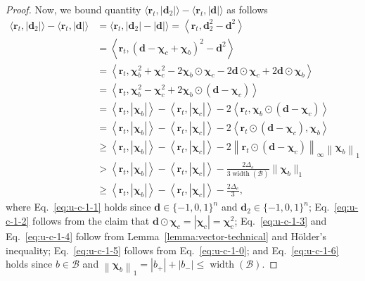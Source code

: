 \documentclass{article}
\newcommand{\B}{\mathcal B}
\DeclareMathOperator{\rank}{width}
\newcommand{\nor}[1]{\left\|#1\right\|}
\renewcommand{\vec}[1]{\boldsymbol{#1}}
\begin{document}
\begin{spacing}{1.1}
\begin{proof}
Now, we bound  quantity $\langle \vec r_t, |\vec d_2| \rangle - \langle \vec r_t, |\vec d| \rangle$ as follows
\begin{align}
\langle \vec r_t, |\vec d_2| \rangle - \langle \vec r_t, |\vec d| \rangle &=
\langle \vec r_t, |\vec d_2|-|\vec d| \rangle = \left\langle \vec r_t, \vec d_2^2- \vec d^2 \right\rangle
\label{eq:u-c-1-1} \\
&= \left\langle \vec r_t, (\vec d-\vec \chi_c+\vec \chi_b)^2- \vec d^2 \right\rangle 
\nonumber \\
&= \left\langle \vec r_t, \vec \chi_b^2+\vec \chi_c^2-2\vec \chi_b\odot \vec \chi_c -
						  2\vec d \odot \vec \chi_c + 2\vec d\odot\vec \chi_b \right\rangle
\nonumber \\
&= \left\langle \vec r_t, \vec \chi_b^2 - \vec \chi_c^2+2\vec \chi_b\odot (\vec d-\vec \chi_c)\right\rangle
\label{eq:u-c-1-2}\\
&= \left\langle \vec r_t, |\vec\chi_b| \right\rangle
  -\left\langle \vec r_t, |\vec\chi_c| \right\rangle
  -2\left\langle \vec r_t, \vec \chi_b\odot (\vec d-\vec \chi_c) \right\rangle
  \nonumber \\
&= \left\langle \vec r_t, |\vec\chi_b| \right\rangle
  -\left\langle \vec r_t, |\vec\chi_c| \right\rangle
  -2\left\langle \vec r_t \odot (\vec d-\vec \chi_c), \vec \chi_b \right\rangle
  \label{eq:u-c-1-3}\\  
& \ge \left\langle \vec r_t, |\vec\chi_b| \right\rangle
  -\left\langle \vec r_t, |\vec\chi_c| \right\rangle
  -2\left\|\vec r_t \odot (\vec d-\vec \chi_c)\right\|_\infty \left\| \vec \chi_b\right\|_1
  \label{eq:u-c-1-4} \\
& > \left\langle \vec r_t, |\vec\chi_b| \right\rangle
  -\left\langle \vec r_t, |\vec\chi_c| \right\rangle
  -\frac{2\Delta_e}{3\rank(\B)} \|\vec\chi_b\|_1 
  \label{eq:u-c-1-5}\\
& \ge \left\langle \vec r_t, |\vec\chi_b| \right\rangle
  -\left\langle \vec r_t, |\vec\chi_c| \right\rangle
  -\frac{2\Delta_e}{3}
  \label{eq:u-c-1-6},
\end{align}
where Eq.~\eqref{eq:u-c-1-1} holds since $\vec d\in \{-1,0,1\}^n$ and $\vec d_2\in \{-1,0,1\}^n$;
Eq.~\eqref{eq:u-c-1-2} follows from the claim that $\vec d \odot \vec \chi_c = |\vec \chi_c|=\vec\chi_c^2$;
Eq.~\eqref{eq:u-c-1-3} and Eq.~\eqref{eq:u-c-1-4} follow from Lemma~\ref{lemma:vector-technical} and H\"older's inequality;
Eq.~\eqref{eq:u-c-1-5} follows from Eq.~\eqref{eq:u-c-1-0};
and Eq.~\eqref{eq:u-c-1-6} holds since $b\in\B$ and $\nor{\vec\chi_b}_1 = |b_+|+|b_-| \le \rank(\B)$.


\end{proof}
\end{spacing}
\end{document}
